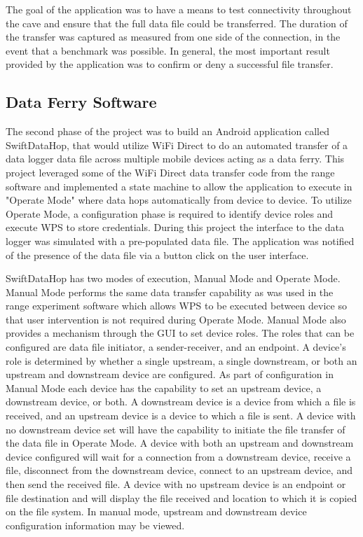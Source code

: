 \documentclass[10pt,twocolumn]{article}
\begin{document}
The goal of the application was to have a means to test connectivity throughout the cave and ensure that the full data file could be transferred.
The duration of the transfer was captured as measured from one side of the connection, in the event that a benchmark was possible.
In general, the most important result provided by the application was to confirm or deny a successful file transfer.

\subsection{Data Ferry Software}
\label{sec:Data Ferry Software}
The second phase of the project was to build an Android application called SwiftDataHop, that would utilize WiFi Direct to do an automated transfer of a data logger data file across multiple mobile devices acting as a data ferry. 
This project leveraged some of the WiFi Direct data transfer code from the range software and implemented a state machine to allow the application to execute in "Operate Mode" where data hops automatically from device to device. 
To utilize Operate Mode, a configuration phase is required to identify device roles and execute WPS to store credentials.
During this project the interface to the data logger was simulated with a pre-populated data file.
The application was notified of the presence of the data file via a button click on the user interface.

SwiftDataHop has two modes of execution, Manual Mode and Operate Mode.
Manual Mode performs the same data transfer capability as was used in the range experiment software which allows WPS to be executed between device so that user intervention is not required during Operate Mode.
Manual Mode also provides a mechanism through the GUI to set device roles.
The roles that can be configured are data file initiator, a sender-receiver, and an endpoint.
A device's role is determined by whether a single upstream, a single downstream, or both an upstream and downstream device are configured.
As part of configuration in Manual Mode each device has the capability to set an upstream device, a downstream device, or both.  
A downstream device is a device from which a file is received, and an upstream device is a device to which a file is sent.
A device with no downstream device set will have the capability to initiate the file transfer of the data file in Operate Mode.
A device with both an upstream and downstream device configured will wait for a connection from a downstream device, receive a file, disconnect from the downstream device, connect to an upstream device, and then send the received file.
A device with no upstream device is an endpoint or file destination and will display the file received and location to which it is copied on the file system.
In manual mode, upstream and downstream device configuration information may be viewed.
\end{document}
